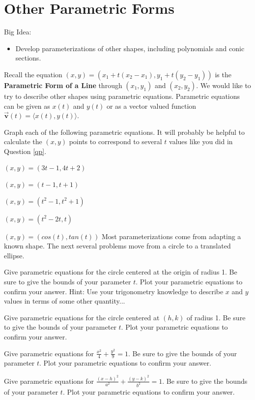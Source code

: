 \section{Other Parametric Forms}
Big Idea:
\begin{itemize}
\item Develop parameterizations of other shapes, including polynomials and conic sections.
\end{itemize}
\begin{info} Recall the equation $(x,y)=(x_1+t(x_2-x_1),y_1+t(y_2-y_1))$ is the \textbf{Parametric Form of a Line} through $(x_1,y_1)$ and $(x_2,y_2)$. We would like to try to describe other shapes using parametric equations. Parametric equations can be given as $x(t)$ and $y(t)$ or as a vector valued function $\vec{\textbf{v}}(t)= \langle x(t),y(t)\rangle$.
\end{info}
\bq Graph each of the following parametric equations. It will probably be helpful to calculate the $(x,y)$ points to correspond to several $t$ values like you did in Question \ref{qp}.
\be
\item $(x,y)=(3t-1,4t+2)$
\item $(x,y)=(t-1,t+1)$
\item $(x,y)=(t^2-1,t^2+1)$
\item $(x,y)=( t^2-2t,t)$
\item $(x,y)=(cos(t),tan(t))$
\ee
\eq
Most parameterizations come from adapting a known shape. The next several problems move from a circle to a translated ellipse.

\question Give parametric equations for the circle centered at the origin of radius 1. Be sure to give the bounds of your parameter $t$. Plot your parametric equations to confirm your answer. Hint: Use your trigonometry knowledge to describe $x$ and $y$ values in terms of some other quantity...

\question Give parametric equations for the circle centered at $(h,k)$ of radius 1. Be sure to give the bounds of your parameter $t$. Plot your parametric equations to confirm your answer.

\question Give parametric equations for $\frac{x^2}{4}+\frac{y^2}{9}=1$. Be sure to give the bounds of your parameter $t$. Plot your parametric equations to confirm your answer.

\question Give parametric equations for $\frac{(x-h)^2}{a^2}+\frac{(y-k)^2}{b^2}=1$. Be sure to give the bounds of your parameter $t$. Plot your parametric equations to confirm your answer.

